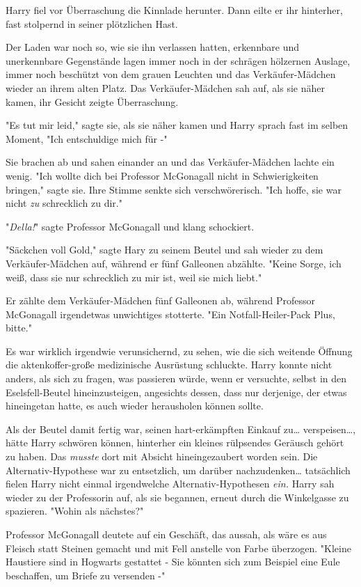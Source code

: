 {Harry fiel vor Überraschung die Kinnlade herunter. Dann eilte er ihr hinterher, fast stolpernd in seiner plötzlichen Hast.

\later

Der Laden war noch so, wie sie ihn verlassen hatten, erkennbare und unerkennbare Gegenstände lagen immer noch in der schrägen hölzernen Auslage, immer noch beschützt von dem grauen Leuchten und das Verkäufer-Mädchen wieder an ihrem alten Platz. Das Verkäufer-Mädchen sah auf, als sie näher kamen, ihr Gesicht zeigte Überraschung.

"Es tut mir leid," sagte sie, als sie näher kamen und Harry sprach fast im selben Moment, "Ich entschuldige mich für -"

Sie brachen ab und sahen einander an und das Verkäufer-Mädchen lachte ein wenig. "Ich wollte dich bei Professor McGonagall nicht in Schwierigkeiten bringen," sagte sie. Ihre Stimme senkte sich verschwörerisch. "Ich hoffe, sie war nicht \emph{zu} schrecklich zu dir."

"\emph{Della!}" sagte Professor McGonagall und klang schockiert.

"Säckchen voll Gold," sagte Hary zu seinem Beutel und sah wieder zu dem Verkäufer-Mädchen auf, während er fünf Galleonen abzählte. "Keine Sorge, ich weiß, dass sie nur schrecklich zu mir ist, weil sie mich liebt."

Er zählte dem Verkäufer-Mädchen fünf Galleonen ab, während Professor McGonagall irgendetwas unwichtiges stotterte. "Ein Notfall-Heiler-Pack Plus, bitte."

Es war wirklich irgendwie verunsichernd, zu sehen, wie die sich weitende Öffnung die aktenkoffer-große medizinische Ausrüstung schluckte. Harry konnte nicht anders, als sich zu fragen, was passieren würde, wenn er versuchte, selbst in den Eselsfell-Beutel hineinzusteigen, angesichts dessen, dass nur derjenige, der etwas hineingetan hatte, es auch wieder herausholen können sollte.

Als der Beutel damit fertig war, seinen hart-erkämpften Einkauf zu… verspeisen…, hätte Harry schwören können, hinterher ein kleines rülpsendes Geräusch gehört zu haben. Das \emph{musste} dort mit Absicht hineingezaubert worden sein. Die Alternativ-Hypothese war zu entsetzlich, um darüber nachzudenken… tatsächlich fielen Harry nicht einmal irgendwelche Alternativ-Hypothesen \emph{ein.} Harry sah wieder zu der Professorin auf, als sie begannen, erneut durch die Winkelgasse zu spazieren. "Wohin als nächstes?"

Professor McGonagall deutete auf ein Geschäft, das aussah, als wäre es aus Fleisch statt Steinen gemacht und mit Fell anstelle von Farbe überzogen. "Kleine Haustiere sind in Hogwarts gestattet - Sie könnten sich zum Beispiel eine Eule beschaffen, um Briefe zu versenden -"

}
